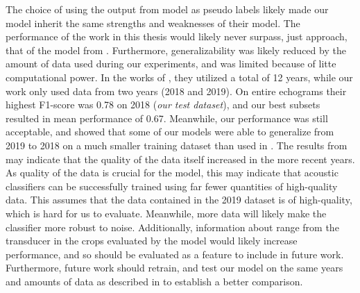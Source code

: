     The choice of using the output from \citeauthor{brautaset2020acoustic} model as pseudo labels likely made our model inherit the same strengths and weaknesses of their model. The performance of the work in this thesis would likely never surpass, just approach, that of the model from \citeauthor{brautaset2020acoustic}. Furthermore, generalizability was likely reduced by the amount of data used during our experiments, and was limited because of litte computational power. In the works of \citeauthor{brautaset2020acoustic}, they utilized a total of 12 years, while our work only used data from two years (2018 and 2019). On entire echograms their highest F1-score was 0.78 on 2018 (\textit{our test dataset}), and our best subsets resulted in mean performance of 0.67. Meanwhile, our performance was still acceptable, and showed that some of our models were able to generalize from 2019 to 2018 on a much smaller training dataset than used in \citeauthor{brautaset2020acoustic}. The results from \citeauthor{brautaset2020acoustic} may indicate that the quality of the data itself increased in the more recent years. As quality of the data is crucial for the model, this may indicate that acoustic classifiers can be successfully trained using far fewer quantities of high-quality data. This assumes that the data contained in the 2019 dataset is of high-quality, which is hard for us to evaluate. Meanwhile, more data will likely make the classifier more robust to noise. Additionally, information about range from the transducer in the crops evaluated by the model would likely increase performance, and so should be evaluated as a feature to include in future work. Furthermore, future work should retrain, and test our model on the same years and amounts of data as described in \citeauthor{brautaset2020acoustic} to establish a better comparison.  

